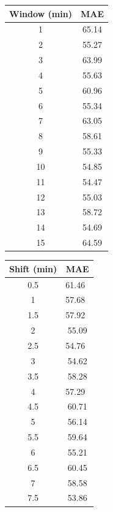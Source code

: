 \begin{center}
\begin{tabular}{| c | c |} 
\hline
Window (min) & MAE  \\ [0.5ex] 
\hline
\hline
 1 & 65.14 \\
 \hline
 2 & 55.27 \\
 \hline
 3 & 63.99 \\
 \hline
 4 & 55.63 \\
 \hline
 5 & 60.96 \\
 \hline
 6 & 55.34 \\
 \hline
 7 & 63.05 \\
 \hline
 8 & 58.61 \\
 \hline
 9 & 55.33 \\
 \hline
 10 & 54.85 \\
 \hline
 11 & 54.47 \\
 \hline
 12 & 55.03 \\
 \hline
 13 & 58.72 \\
 \hline
 14 & 54.69 \\
 \hline
 15 & 64.59 \\
\hline
\end{tabular}
\end{center}

\begin{center}
\begin{tabular}{| c | c |} 
\hline
Shift (min) & MAE  \\ [0.5ex] 
\hline
\hline
0.5 & 61.46\ \\
\hline
1 & 57.68\ \\
\hline 
1.5 & 57.92\ \\
\hline 
2 & 55.09 \\
\hline 
2.5 & 54.76\ \\
\hline 
3 & 54.62 \\
\hline 
3.5 & 58.28 \\
\hline 
4 & 57.29\ \\
\hline 
4.5 & 60.71 \\
\hline 
5 & 56.14 \\
\hline
5.5 & 59.64 \\
\hline 
6 & 55.21 \\
\hline
6.5 & 60.45 \\
\hline
7 & 58.58 \\
\hline 
7.5 & 53.86 \\
\hline
\end{tabular}
\end{center}

